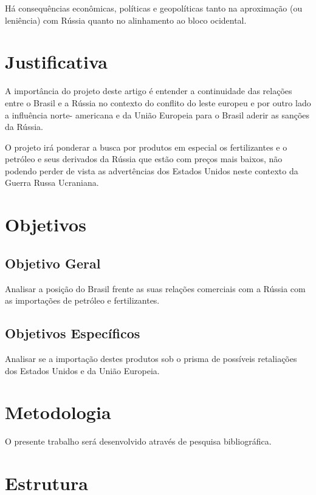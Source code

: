 \documentclass[article,12pt,oneside,a4paper,english,brazil,sumario=tradicional]{abntex2}
\begin{document}
Há consequências econômicas, políticas e geopolíticas tanto na aproximação (ou leniência) com Rússia quanto no alinhamento ao bloco ocidental.


\section*{Justificativa}

A importância do projeto deste artigo é entender a continuidade das relações entre o Brasil e a Rússia no contexto do conflito do leste europeu  e por outro lado a influência norte- americana e da União Europeia para o Brasil aderir as sanções da Rússia.

O projeto irá ponderar a busca por produtos em especial os fertilizantes e o petróleo e seus derivados da Rússia que estão com preços mais baixos, não podendo perder de vista as advertências dos Estados Unidos neste contexto da Guerra Russa Ucraniana.

\section*{Objetivos}

\subsection*{Objetivo Geral}

Analisar a posição do Brasil frente as suas relações comerciais com a Rússia com as importações de petróleo e fertilizantes.

\subsection*{Objetivos Específicos}

Analisar se a importação destes produtos sob o prisma de possíveis retaliações dos Estados Unidos e da União Europeia.

\section*{Metodologia}

O presente trabalho será desenvolvido através de pesquisa bibliográfica.

\section*{Estrutura}

\renewcommand\thesubsection{\arabic{subsection}}
\end{document}

